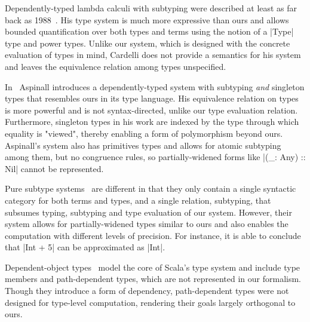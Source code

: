 \begin{diff}
Dependently-typed lambda calculi with subtyping were described at least as far back as 1988~\citep{cardelli1988structural}.
His type system is much more expressive than ours and allows bounded quantification over both types and terms using the notion of a |Type| type and power types.
Unlike our system, which is designed with the concrete evaluation of types in mind, Cardelli does not provide a semantics for his system and leaves the equivalence relation among types unspecified.

In~\citep{aspinall1994subtyping} Aspinall introduces a dependently-typed system with subtyping \emph{and} singleton types that resembles ours in its type language.
His equivalence relation on types is more powerful and is not syntax-directed, unlike our type evaluation relation.
Furthermore, singleton types in his work are indexed by the type through which equality is "viewed", thereby enabling a form of polymorphism beyond ours.
Aspinall's system also has primitives types and allows for atomic subtyping among them, but no congruence rules, so partially-widened forms like |(_: Any) :: Nil| cannot be represented.

Pure subtype systems~\citep{hutchins2010pure} are different in that they only contain a single syntactic category for both terms and types, and a single relation, subtyping, that subsumes typing, subtyping and type evaluation of our system.
However, their system allows for partially-widened types similar to ours and also enables the computation with different levels of precision.
For instance, it is able to conclude that |Int + 5| can be approximated as |Int|.

Dependent-object types~\citep{amin2017type} model the core of Scala's type system and include type members and path-dependent types, which are not represented in our formalism.
Though they introduce a form of dependency, path-dependent types were not designed for type-level computation, rendering their goals largely orthogonal to ours.
\end{diff}
